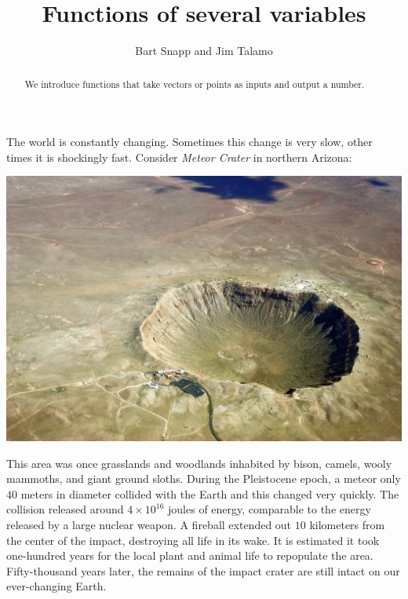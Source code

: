 \documentclass{ximera}
\author{Bart Snapp and Jim Talamo}
\title[Dig-In:]{Functions of several variables}
\begin{document}
\begin{abstract}
  We introduce functions that take vectors or points as inputs and
  output a number.
\end{abstract}
\maketitle



The world is constantly changing. Sometimes this change is very slow,
other times it is shockingly fast. Consider \textit{Meteor Crater} in
northern Arizona:
\begin{image}[3in]
  \includegraphics{meteorcrater.jpg}
\end{image}
This area was once grasslands and woodlands inhabited by bison,
camels, wooly mammoths, and giant ground sloths. During the
Pleistocene epoch, a meteor only $40$ meters in diameter collided
with the Earth and this changed very quickly. The collision released
around $4\times10^{16}$ joules of energy, comparable to the energy
released by a large nuclear weapon. A fireball extended out $10$
kilometers from the center of the impact, destroying all life in its
wake. It is estimated it took one-hundred years for the local plant
and animal life to repopulate the area.  Fifty-thousand years later,
the remains of the impact crater are still intact on our ever-changing
Earth.
\end{document}

